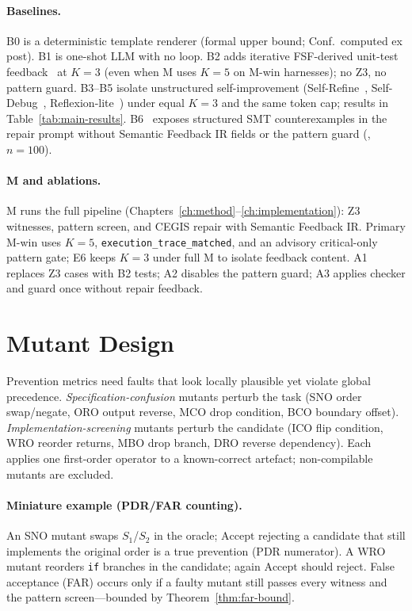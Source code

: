 \paragraph{Baselines.}
B0 is a deterministic template renderer (formal upper bound; Conf.\ computed
ex post).
B1 is one-shot LLM with no loop.
B2 adds iterative FSF-derived unit-test feedback~\citep{zhu1997specification}
at $K{=}3$ (even when M uses $K{=}5$ on M-win harnesses); no Z3, no pattern
guard.
B3--B5 isolate unstructured self-improvement
(Self-Refine~\citep{madaan2023selfrefine}, Self-Debug~\citep{chen2024selfdebug},
Reflexion-lite~\citep{shinn2023reflexion}) under equal $K{=}3$ and the same
token cap; results in Table~\ref{tab:main-results}.
B6~\citep{sun2024clover} exposes structured SMT counterexamples in the repair
prompt without Semantic Feedback IR fields or the pattern guard
(, $n{=}100$).

\paragraph{M and ablations.}
M runs the full pipeline (Chapters~\ref{ch:method}--\ref{ch:implementation}):
Z3 witnesses, pattern screen, and CEGIS repair with Semantic Feedback IR.
Primary M-win uses $K{=}5$, \texttt{execution\_trace\_matched}, and an advisory
critical-only pattern gate; E6 keeps $K{=}3$ under full M to isolate feedback
content.
A1 replaces Z3 cases with B2 tests; A2 disables the pattern guard; A3 applies
checker and guard once without repair feedback.

\section{Mutant Design}
\label{sec:exp:mutants}

Prevention metrics need faults that look locally plausible yet violate global
precedence.
\emph{Specification-confusion} mutants perturb the task (SNO order swap/negate,
ORO output reverse, MCO drop condition, BCO boundary offset).
\emph{Implementation-screening} mutants perturb the candidate (ICO flip
condition, WRO reorder returns, MBO drop branch, DRO reverse dependency).
Each applies one first-order operator to a known-correct artefact;
non-compilable mutants are excluded.

\paragraph{Miniature example (PDR/FAR counting).}
An SNO mutant swaps $S_1$/$S_2$ in the oracle; $\mathrm{Accept}$ rejecting a
candidate that still implements the original order is a true prevention
(PDR numerator).
A WRO mutant reorders \texttt{if} branches in the candidate; again
$\mathrm{Accept}$ should reject.
False acceptance (FAR) occurs only if a faulty mutant still passes every
witness and the pattern screen---bounded by Theorem~\ref{thm:far-bound}.

